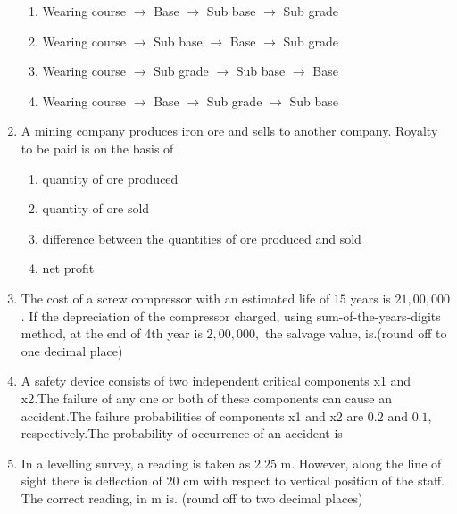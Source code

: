 \documentclass[journal,12pt,onecolumn]{IEEEtran}
\theoremstyle{remark}
\begin{document}
\begin{enumerate}
\hfill{}
\begin{enumerate}
\item  Wearing course $\rightarrow$ Base $\rightarrow$ Sub base $\rightarrow$ Sub grade
\item Wearing course $\rightarrow$ Sub base $\rightarrow$ Base $\rightarrow$ Sub grade
\item Wearing course $\rightarrow$ Sub grade $\rightarrow$ Sub base $\rightarrow$ Base
\item Wearing course $\rightarrow$ Base $\rightarrow$ Sub grade $\rightarrow$ Sub base
\end{enumerate}
\item A mining company produces iron ore and sells to another company. Royalty to be paid is on the basis of 

\hfill{}
\begin{multicols}{2}
\begin{enumerate}
\item quantity of ore produced 
\item quantity of ore sold 
\item difference between the quantities of ore produced and sold
\item net profit 
\end{enumerate}
\end{multicols}

\item The cost of a screw compressor with an estimated life of $15$ years is $21,00,000$. If the depreciation of the compressor charged, using sum-of-the-years-digits
method, at the end of 4th year is $2,00,000,$ the salvage value, is.(round off to one decimal place) 

\hfill{}
\item A safety device consists of two independent critical components x1 and x2.The failure of any one or both of these components can cause an accident.The failure probabilities of components x1 and x2 are $0.2$ and $0.1$, respectively.The probability of occurrence of an accident is 

\hfill{}
\item In a levelling survey, a reading is taken as $2.25$ m. However, along the line of sight there is deflection of $20$ cm with respect to vertical position of the staff. The correct reading, in m is. (round off to two decimal places) 

\hfill{}


\end{enumerate}
\end{document}
